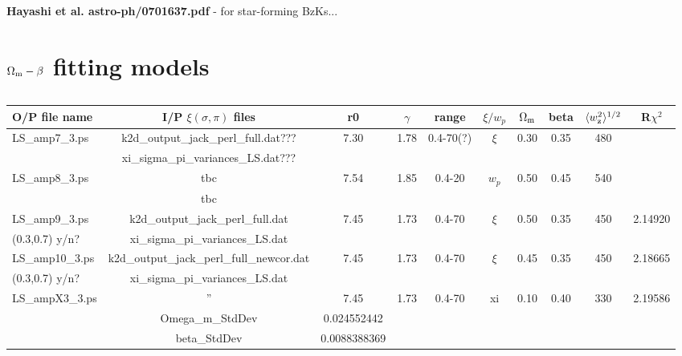 \documentclass[usenatbib]{mn2e}
\def \Omm {\Omega_{\rm m}}
\def \wrms {\langle w_{\rm z}^2\rangle^{1/2}}
\def \xisp{\xi(\sigma, \pi)}
\begin{document}
{\bf Hayashi et al. astro-ph/0701637.pdf} - for star-forming BzKs...




\section{$\Omega_{\rm m}-\beta$ fitting models}

\begin{table*}
\begin{center}
\caption{}
\setlength{\tabcolsep}{1pt}
\begin{tabular}{lccccccccc}
\hline
\hline
O/P file name  &   I/P $\xisp$ files                  &  r0  & $\gamma$ &  range    &  $\xi/w_p$ & $\Omm$ & beta & $\wrms$ & R$\chi^2$ \\

\hline
LS\_amp7\_3.ps & k2d\_output\_jack\_perl\_full.dat??? &	7.30 & 1.78      &  0.4-70(?) & $\xi$   &  0.30  & 0.35 & 480  & \\ 
               & xi\_sigma\_pi\_variances\_LS.dat???  &      &           &            &         &        &      &      & \\[8pt]
%
%
LS\_amp8\_3.ps & tbc                                  & 7.54 & 1.85      & 0.4-20     & $w_p$  &  0.50  & 0.45 & 540  & \\
               & tbc                                  &      &           &            &         &        &      &      & \\[8pt]
%
%
LS\_amp9\_3.ps & k2d\_output\_jack\_perl\_full.dat    & 7.45 & 1.73      & 0.4-70     & $\xi$   &  0.50	 & 0.35	& 450  & 2.14920  \\
(0.3,0.7) y/n? & xi\_sigma\_pi\_variances\_LS.dat     &      &           &            &         &        &      &      &          \\[8pt]
%
%
LS\_amp10\_3.ps & k2d\_output\_jack\_perl\_full\_newcor.dat & 7.45 &  1.73 & 0.4-70   & $\xi$	& 0.45	& 0.35	& 450	& 2.18665 \\
(0.3,0.7) y/n?  & xi\_sigma\_pi\_variances\_LS.dat          &      &       &          &         &       &       &       &         \\
%
LS\_ampX3\_3.ps	& ''                                        & 7.45          & 1.73    & 0.4-70   & xi      & 0.10  & 0.40 & 330  &  2.19586 \\
		& Omega\_m\_StdDev                          &  0.024552442  &         &          &         &       &      &      & \\
		& beta\_StdDev                              &  0.0088388369 &         &          &         &       &      &      & \\

\end{tabular}
\end{center}
\end{table*}
\end{document}
